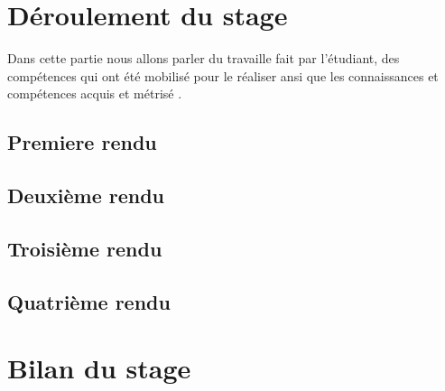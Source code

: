 \documentclass[12pt]{article}
\begin{document}
\newpage

\section{Déroulement du stage}

Dans cette partie nous allons parler du travaille fait par l'étudiant, des compétences qui ont été mobilisé pour le réaliser ansi que les connaissances et compétences acquis et métrisé .

\subsection{Premiere rendu}



\subsection{Deuxième rendu}
\subsection{Troisième rendu}
\subsection{Quatrième rendu}

\section{Bilan du stage}
\end{document}
